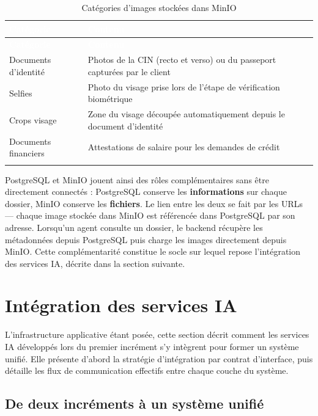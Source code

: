 \renewcommand{\arraystretch}{1.3}
\begin{longtable}{|p{4cm}|p{10cm}|}
  \rowcolor{bleu_principal}
  \textcolor{white}{\textbf{Catégorie}} & \textcolor{white}{\textbf{Contenu}} \\
  \hline
  \endfirsthead
  \rowcolor{bleu_principal}
  \textcolor{white}{\textbf{Catégorie}} & \textcolor{white}{\textbf{Contenu}} \\
  \hline
  \endhead
  Documents d'identité & Photos de la CIN (recto et verso) ou du passeport capturées par le client \\ \hline
  Selfies              & Photo du visage prise lors de l'étape de vérification biométrique \\ \hline
  Crops visage         & Zone du visage découpée automatiquement depuis le document d'identité \\ \hline
  Documents financiers & Attestations de salaire pour les demandes de crédit \\ \hline
  \caption{Catégories d'images stockées dans MinIO}
  \label{tab:minio-categories}
\end{longtable}

PostgreSQL et MinIO jouent ainsi des rôles complémentaires sans être directement connectés : PostgreSQL conserve les \textbf{informations} sur chaque dossier, MinIO conserve les \textbf{fichiers}. Le lien entre les deux se fait par les URLs — chaque image stockée dans MinIO est référencée dans PostgreSQL par son adresse. Lorsqu'un agent consulte un dossier, le backend récupère les métadonnées depuis PostgreSQL puis charge les images directement depuis MinIO. Cette complémentarité constitue le socle sur lequel repose l'intégration des services IA, décrite dans la section suivante.


\section{Intégration des services IA}
\label{sec:integration-ia}

L'infrastructure applicative étant posée, cette section décrit comment les services IA développés lors du premier incrément s'y intègrent pour former un système unifié. Elle présente d'abord la stratégie d'intégration par contrat d'interface, puis détaille les flux de communication effectifs entre chaque couche du système.

\subsection{De deux incréments à un système unifié}
\label{subsec:integration-increments}

